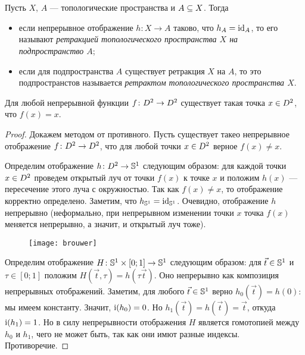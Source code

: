 \documentclass[main]{subfiles}
\begin{document}
\resetcounters

\section{}

\begin{definition}
	Пусть $ X $, $ A $ --- топологические пространства и $ A \ssq X $. Тогда
	\begin{itemize}
		\item если непрерывное отображение $ h \colon X \to A $ таково, что $ h_A = \Id_A $,
			то его называют \emph{ретракцией топологического пространства $ X $ на подпространство $ A $};
		\item если для подпространства $ A $ существует ретракция $ X $ на $ A $, то это подпространстов называется
			\emph{ретрактом топологического пространства $ X $}.
	\end{itemize}
\end{definition}

\begin{theorem}[Бр\'{а}уэра]
	Для любой непрерывной функции $ f \colon \D^2 \to \D^2 $ существует такая точка $ x \in \D^2 $, что $ f(x) = x $.
\end{theorem}

\begin{proof}
	Докажем методом от противного. Пусть существует такео непрерывное отображение $ f \colon \D^2 \to \D^2 $,
	что для любой точки $ x \in \D^2 $ верное $ f(x) \neq x $.

	Определим отображение $ h  \colon \D^2 \to \S^1 $ следующим образом: для каждой точки $ x \in \D^2 $ проведем
	открытый луч от точки $ f(x) $ к точке $ x $ и положим $ h(x) $ --- пересечение этого луча с окружностью.
	Так как $ f(x) \neq x $, то отображение корректно определено. Заметим, что $ h_{\S^1} = \Id_{\S^1} $.
	Очевидно, отображение $ h $ непрерывно (неформально, при непрерывном изменении точки $ x $ точка $ f(x) $
	меняется непрерывно, а значит, и открытый луч тоже).

	\begin{figure}[H]
		\centering \texttt{[image: brouwer]}
	\end{figure}

	Определим отображение $ H \colon \S^1 \times [0;1] \to \S^1 $ следующим образом: для $ \vec{t} \in \S^1 $ и
	$ \tau \in [0;1] $ положим $ H(\vec{t}, \tau) = h(\tau \vec{t}) $. Оно непрерывно как композиция непрерывных
	отображений. Заметим, для любого $ \vec{t} \in \S^1 $ верно $ h_0(\vec{t}) = h(0) $:
	мы имеем константу. Значит, $ \Ind(h_0) = 0 $. Но $ h_1(\vec{t}) = h(\vec{t}) = \vec{t} $, откуда
	$ \Ind(h_1) = 1 $. Но в силу непрерывности отображения $ H $ является гомотопией между $ h_0 $ и $ h_1 $, чего
	не может быть, так как они имют разные индексы. Противоречие.
\end{proof}
\end{document}
